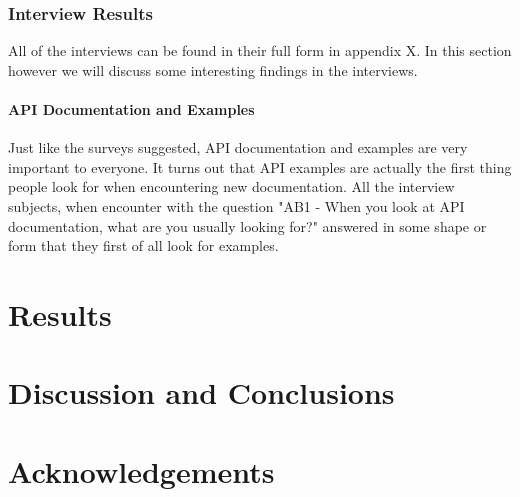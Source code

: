 \documentclass{article}
\begin{document}
\subsubsection{Interview Results}

All of the interviews can be found in their full form in appendix X. In this section however
we will discuss some interesting findings in the interviews.

\paragraph{API Documentation and Examples}

Just like the surveys suggested, API documentation and examples are very important
to everyone. It turns out that API examples are actually the first thing people
look for when encountering new documentation. All the interview subjects, when
encounter with the question "AB1 - When you look at API documentation, what are you usually looking for?"
answered in some shape or form that they first of all look for examples.

\section{Results}

\section{Discussion and Conclusions}

\section{Acknowledgements}




\end{document}
